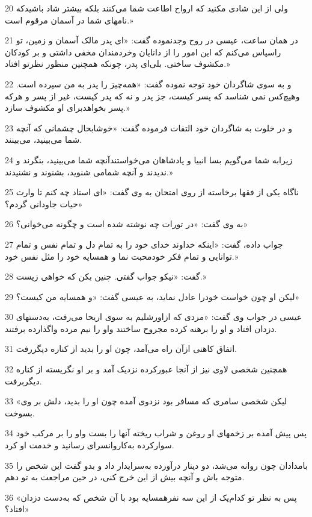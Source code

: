 \par 20 ولی از این شادی مکنید که ارواح اطاعت شما می‌کنند بلکه بیشتر شاد باشیدکه نامهای شما در آسمان مرقوم است.»
\par 21 در همان ساعت، عیسی در روح وجدنموده گفت: «ای پدر مالک آسمان و زمین، تو راسپاس می‌کنم که این امور را از دانایان وخردمندان مخفی داشتی و بر کودکان مکشوف ساختی. بلی‌ای پدر، چونکه همچنین منظور نظرتو افتاد.»
\par 22 و به سوی شاگردان خود توجه نموده گفت: «همه‌چیز را پدر به من سپرده است. وهیچ‌کس نمی شناسد که پسر کیست، جز پدر و نه که پدر کیست، غیر از پسر و هر‌که پسر بخواهدبرای او مکشوف سازد.»
\par 23 و در خلوت به شاگردان خود التفات فرموده گفت: «خوشابحال چشمانی که آنچه شما می‌بینید، می‌بینند.
\par 24 زیرابه شما می‌گویم بسا انبیا و پادشاهان می‌خواستندآنچه شما می‌بینید، بنگرند و ندیدند و آنچه شمامی شنوید، بشنوند و نشنیدند.»
\par 25 ناگاه یکی از فقها برخاسته از روی امتحان به وی گفت: «ای استاد چه کنم تا وارث حیات جاودانی گردم؟»
\par 26 به وی گفت: «در تورات چه نوشته شده است و چگونه می‌خوانی؟»
\par 27 جواب داده، گفت: «اینکه خداوند خدای خود را به تمام دل و تمام نفس و تمام توانایی و تمام فکر خودمحبت نما و همسایه خود را مثل نفس خود.»
\par 28 گفت: «نیکو جواب گفتی. چنین بکن که خواهی زیست.»
\par 29 لیکن او چون خواست خودرا عادل نماید، به عیسی گفت: «و همسایه من کیست؟»
\par 30 عیسی در جواب وی گفت: «مردی که ازاورشلیم به سوی اریحا می‌رفت، به‌دستهای دزدان افتاد و او را برهنه کرده مجروح ساختند واو را نیم مرده واگذارده برفتند.
\par 31 اتفاق کاهنی ازآن راه می‌آمد، چون او را بدید از کناره دیگررفت.
\par 32 همچنین شخصی لاوی نیز از آنجا عبورکرده نزدیک آمد و بر او نگریسته از کناره دیگربرفت.
\par 33 «لیکن شخصی سامری که مسافر بود نزدوی آمده چون او را بدید، دلش بر وی بسوخت.
\par 34 پس پیش آمده بر زخمهای او روغن و شراب ریخته آنها را بست واو را بر مرکب خود سوارکرده به‌کاروانسرای رسانید و خدمت او کرد.
\par 35 بامدادان چون روانه می‌شد، دو دینار درآورده به‌سرایدار داد و بدو گفت این شخص را متوجه باش و آنچه بیش از این خرج کنی، در حین مراجعت به تو دهم.
\par 36 «پس به نظر تو کدام‌یک از این سه نفرهمسایه بود با آن شخص که به‌دست دزدان افتاد؟»
